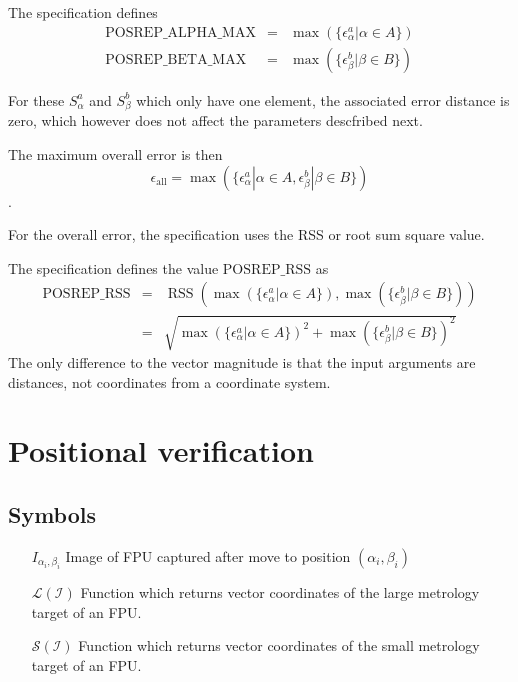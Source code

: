 \documentclass[11pt,a4paper,twoside]{scrartcl}
\DeclareMathOperator{\RSS}{RSS}
\begin{document}
The specification defines
\begin{eqnarray}
  \mathrm{POSREP\_ALPHA\_MAX} & = &  \max(\{ \epsilon^{a}_\alpha | \alpha \in A \}) \\
  \mathrm{POSREP\_BETA\_MAX} & = & \max(\{ \epsilon^{b}_\beta | \beta \in B \})
\end{eqnarray}

For these $ S^a_\alpha $ and $S^b_\beta$ which only have one element,
the associated error distance is zero, which however does not affect
the parameters descfribed next.


The maximum overall error is then
\begin{equation}
  \epsilon_\mathrm{all} = \max(\{\epsilon^{a}_\alpha | \alpha \in A, \epsilon^{b}_\beta | \beta \in B \})
\end{equation}.


For the overall error, the specification uses the RSS or root sum
square value.

The specification defines the value $\mathrm{POSREP\_RSS}$ as
\begin{eqnarray}
  \mathrm{POSREP\_RSS} & = &  \RSS( \max(\{\epsilon^{a}_\alpha| \alpha \in A\}), \max(\{\epsilon^{b}_\beta| \beta \in B\}) ) \\
  & = & \sqrt{\max(\{\epsilon^{a}_\alpha| \alpha \in A\})^2 + \max(\{\epsilon^{b}_\beta| \beta \in B\})^2 }
\end{eqnarray}
The only difference to the vector magnitude is that the input
arguments are distances, not coordinates from a coordinate system.


\section{Positional verification}
\subsection{Symbols}
\begin{itemize}
  \item[]
\item[$I_{\alpha_i,\beta_i}$] Image of FPU captured after move to position $(\alpha_i,\beta_i)$
\item[$\mathcal{L(I)}$] Function which returns vector coordinates of
  the large metrology target of an FPU.
\item[$\mathcal{S(I)}$] Function which returns vector coordinates of
  the small metrology target of an FPU.

\end{itemize}
\end{document}
